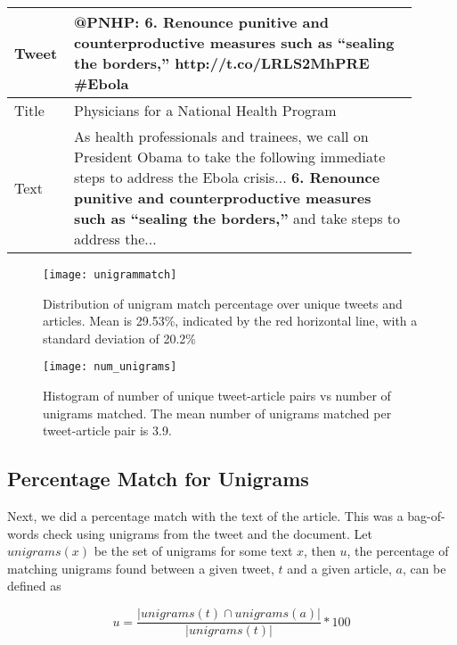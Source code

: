 \begin{table}[htbp]
\centering
\begin{tabular}{|p{0.1\linewidth}|p{0.8\linewidth}|}
\hline
Tweet &  @PNHP: \textbf{6. Renounce punitive and counterproductive measures such as “sealing the borders,”} http://t.co/LRLS2MhPRE \#Ebola \\ \hline
Title & Physicians for a National Health Program \\  \hline
Text  & As health professionals and trainees, we call on President Obama to take the following immediate steps to address the Ebola crisis... \textbf{6. Renounce punitive and counterproductive measures such as “sealing the borders,”} and take steps to address the... \\ \hline
\end{tabular}
\label{tab:fullextract}
\end{table}


\begin{figure}[tbp]
\centering
\texttt{[image: unigrammatch]}
\caption{Distribution of unigram match percentage over unique tweets and articles. Mean is 29.53\%, indicated by the red horizontal line, with a standard deviation of 20.2\%}
\label{fig:unigrammatch}
\end{figure}


\begin{figure}[tbp]
\centering
\texttt{[image: num\_unigrams]}
\caption{Histogram of number of unique tweet-article pairs vs number of unigrams matched. The mean number of unigrams matched per tweet-article pair is 3.9.}
\label{fig:num_unigrams}
\end{figure}


\subsection{Percentage Match for Unigrams}
\label{sec:unigrams}

Next, we did a percentage match with the text of the article. This was a bag-of-words check using unigrams from the tweet and the document. Let $\textit{unigrams}(x)$ be the set of unigrams for some text $x$, then $u$, the percentage of matching unigrams found between a given tweet, $t$ and a given article, $a$, can be defined as  

\begin{equation}
u = \frac{| unigrams(t) \cap unigrams(a) |}{| unigrams(t) |} * 100
\end{equation}

